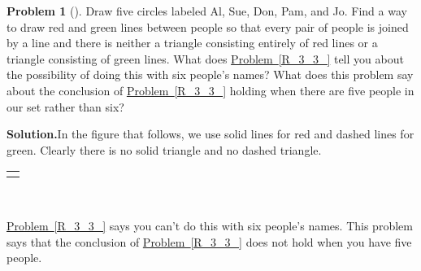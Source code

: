 \documentclass[10pt,]{book}
\theoremstyle{plain}
\theoremstyle{definition}
\newtheorem{activity}[project]{Problem}
\theoremstyle{definition}
\numberwithin{equation}{chapter}
\newlength{\panelmax}
\begin{document}
\begin{activity}[]\label{notR_3_3_}
Draw five circles labeled Al, Sue, Don, Pam, and Jo. Find a way to draw red and green lines between people so that every pair of people is joined by a line and there is neither a triangle consisting entirely of red lines or a triangle consisting of green lines. What does \hyperref[R_3_3_]{Problem~\ref{R_3_3_}} tell you about the possibility of doing this with six people's names? What does this problem say about the conclusion of \hyperref[R_3_3_]{Problem~\ref{R_3_3_}} holding when there are five people in our set rather than six?%
\par\medskip\noindent%
\textbf{Solution.}\quad In the figure that follows, we use solid lines for red and dashed lines for green. Clearly there is no solid triangle and no dashed triangle.%
{%
\setlength{\panelmax}{0pt}
\newsavebox{\panelboxHimage}
\newlength{\phHimage}\setlength{\phHimage}{\ht\panelboxHimage+\dp\panelboxHimage}
\settototalheight{\phHimage}{\usebox{\panelboxHimage}}
\setlength{\panelmax}{\maxof{\panelmax}{\phHimage}}
\leavevmode%
\setlength{\tabcolsep}{0\linewidth}
\par\medskip\noindent
\begin{tabular}{@{}*{1}{c}@{}}
\begin{minipage}[c][\panelmax][t]{1\linewidth}\usebox{\panelboxHimage}\end{minipage}\end{tabular}\\
}%
\par
\hyperref[R_3_3_]{Problem~\ref{R_3_3_}} says you can't do this with six people's names. This problem says that the conclusion of \hyperref[R_3_3_]{Problem~\ref{R_3_3_}} does not hold when you have five people.%
\end{activity}
\typeout{************************************************}
\typeout{************************************************}
\end{document}

